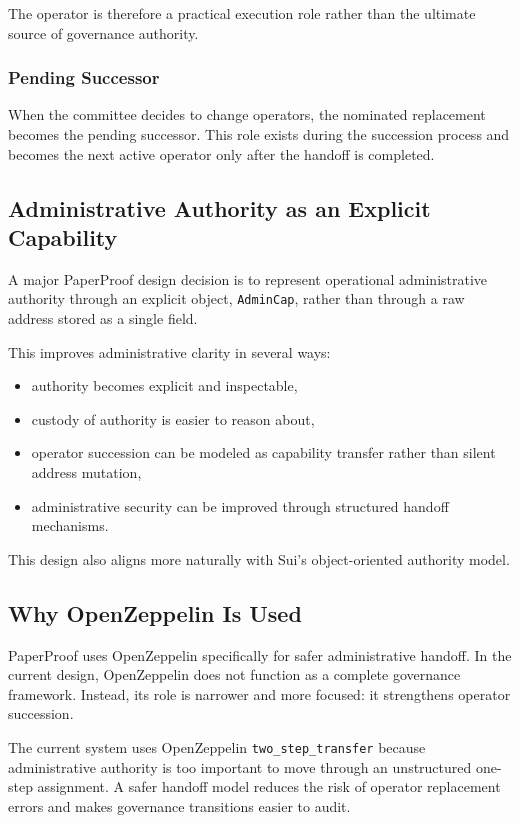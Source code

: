 \documentclass[journal]{IEEEtran}
\begin{document}
The operator is therefore a practical execution role rather than the ultimate source of governance authority.

\subsubsection{Pending Successor}

When the committee decides to change operators, the nominated replacement becomes the pending successor. This role exists during the succession process and becomes the next active operator only after the handoff is completed.

\subsection{Administrative Authority as an Explicit Capability}

A major PaperProof design decision is to represent operational administrative authority through an explicit object, \texttt{AdminCap}, rather than through a raw address stored as a single field.

This improves administrative clarity in several ways:
\begin{itemize}
    \item authority becomes explicit and inspectable,
    \item custody of authority is easier to reason about,
    \item operator succession can be modeled as capability transfer rather than silent address mutation,
    \item administrative security can be improved through structured handoff mechanisms.
\end{itemize}


This design also aligns more naturally with Sui's object-oriented authority model.

\subsection{Why OpenZeppelin Is Used}

PaperProof uses OpenZeppelin specifically for safer administrative handoff. In the current design, OpenZeppelin does not function as a complete governance framework. Instead, its role is narrower and more focused: it strengthens operator succession.

The current system uses OpenZeppelin \texttt{two\_step\_transfer} because administrative authority is too important to move through an unstructured one-step assignment. A safer handoff model reduces the risk of operator replacement errors and makes governance transitions easier to audit.
\end{document}
